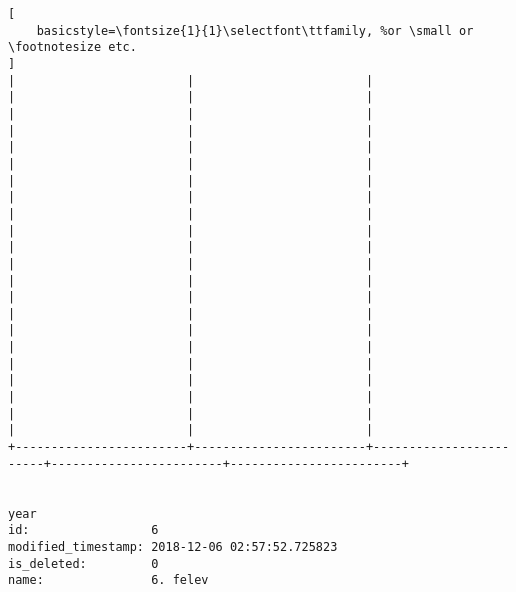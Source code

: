 \begin{lstlisting}[
    basicstyle=\fontsize{1}{1}\selectfont\ttfamily, %or \small or \footnotesize etc.
]
|                        |                        |                        |                        |                        | 
|                        |                        |                        |                        |                        | 
|                        |                        |                        |                        |                        | 
|                        |                        |                        |                        |                        | 
|                        |                        |                        |                        |                        | 
|                        |                        |                        |                        |                        | 
|                        |                        |                        |                        |                        | 
|                        |                        |                        |                        |                        | 
|                        |                        |                        |                        |                        | 
|                        |                        |                        |                        |                        | 
|                        |                        |                        |                        |                        | 
+------------------------+------------------------+------------------------+------------------------+------------------------+


year                
id:                 6
modified_timestamp: 2018-12-06 02:57:52.725823
is_deleted:         0
name:               6. felev


\end{lstlisting}
